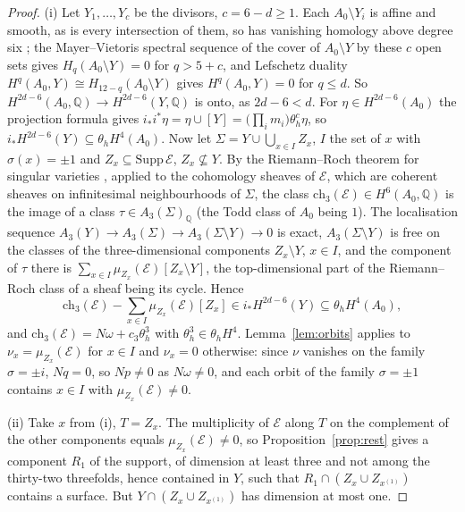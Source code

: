 \documentclass[11pt,reqno]{amsart}
\numberwithin{equation}{section}
\theoremstyle{plain}
\theoremstyle{definition}
\newcommand{\QQ}{\mathbb{Q}}
\newcommand{\ch}{\mathrm{ch}}
\begin{document}
\begin{proof}
(i) Let $Y_{1},\dots,Y_{c}$ be the divisors, $c=6-d\ge1$. Each $A_{0}\setminus Y_{i}$ is affine and smooth, as is every intersection of them, so has vanishing homology above degree six \cite{AF59}; the Mayer--Vietoris spectral sequence of the cover of $A_{0}\setminus Y$ by these $c$ open sets gives $H_{q}(A_{0}\setminus Y)=0$ for $q>5+c$, and Lefschetz duality $H^{q}(A_{0},Y)\cong H_{12-q}(A_{0}\setminus Y)$ gives $H^{q}(A_{0},Y)=0$ for $q\le d$. So $H^{2d-6}(A_{0},\QQ)\to H^{2d-6}(Y,\QQ)$ is onto, as $2d-6<d$. For $\eta\in H^{2d-6}(A_{0})$ the projection formula gives $i_{*}i^{*}\eta=\eta\cup[Y]=\bigl(\prod_{i}m_{i}\bigr)\theta_{h}^{c}\eta$, so $i_{*}H^{2d-6}(Y)\subseteq\theta_{h}H^{4}(A_{0})$. Now let $\Sigma=Y\cup\bigcup_{x\in I}Z_{x}$, $I$ the set of $x$ with $\sigma(x)=\pm1$ and $Z_{x}\subseteq\mathrm{Supp}\,\mathcal{E}$, $Z_{x}\not\subseteq Y$. By the Riemann--Roch theorem for singular varieties \cite[Ch.~18]{Ful98}, applied to the cohomology sheaves of $\mathcal{E}$, which are coherent sheaves on infinitesimal neighbourhoods of $\Sigma$, the class $\ch_{3}(\mathcal{E})\in H^{6}(A_{0},\QQ)$ is the image of a class $\tau\in A_{3}(\Sigma)_{\QQ}$ (the Todd class of $A_{0}$ being $1$). The localisation sequence $A_{3}(Y)\to A_{3}(\Sigma)\to A_{3}(\Sigma\setminus Y)\to0$ is exact, $A_{3}(\Sigma\setminus Y)$ is free on the classes of the three-dimensional components $Z_{x}\setminus Y$, $x\in I$, and the component of $\tau$ there is $\sum_{x\in I}\mu_{Z_{x}}(\mathcal{E})[Z_{x}\setminus Y]$, the top-dimensional part of the Riemann--Roch class of a sheaf being its cycle. Hence
\[
\ch_{3}(\mathcal{E})-\sum_{x\in I}\mu_{Z_{x}}(\mathcal{E})[Z_{x}]\in i_{*}H^{2d-6}(Y)\subseteq\theta_{h}H^{4}(A_{0}),
\]
and $\ch_{3}(\mathcal{E})=N\omega+c_{3}\theta_{h}^{3}$ with $\theta_{h}^{3}\in\theta_{h}H^{4}$. Lemma~\ref{lem:orbits} applies to $\nu_{x}=\mu_{Z_{x}}(\mathcal{E})$ for $x\in I$ and $\nu_{x}=0$ otherwise: since $\nu$ vanishes on the family $\sigma=\pm i$, $Nq=0$, so $Np\ne0$ as $N\omega\ne0$, and each orbit of the family $\sigma=\pm1$ contains $x\in I$ with $\mu_{Z_{x}}(\mathcal{E})\ne0$.

(ii) Take $x$ from (i), $T=Z_{x}$. The multiplicity of $\mathcal{E}$ along $T$ on the complement of the other components equals $\mu_{Z_{x}}(\mathcal{E})\ne0$, so Proposition~\ref{prop:rest} gives a component $R_{1}$ of the support, of dimension at least three and not among the thirty-two threefolds, hence contained in $Y$, such that $R_{1}\cap(Z_{x}\cup Z_{x^{(1)}})$ contains a surface. But $Y\cap(Z_{x}\cup Z_{x^{(1)}})$ has dimension at most one.
\end{proof}
\end{document}
